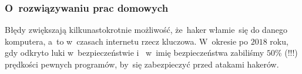 \documentclass[10pt,t]{beamer}
\begin{document}
\begin{frame}
  \frametitle{O~rozwiązywaniu prac domowych}


  Błędy zwiększają kilkunastokrotnie możliwość, że~haker włamie~się do
  danego komputera, a~to w~czasach internetu rzecz kluczowa. W~okresie po
  $2018$ roku, gdy odkryto luki w~bezpieczeństwie
  i~
  w~imię bezpieczeństwa zabiliśmy $50$\% (!!!) prędkości pewnych programów,
  by~się zabezpieczyć przed atakami hakerów.










\end{frame}
\end{document}
